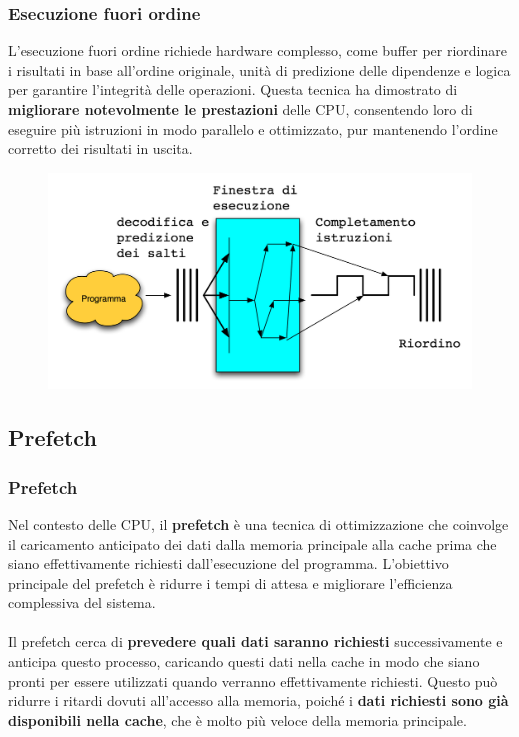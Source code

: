 \begin{frame}
	\frametitle{ Esecuzione fuori ordine}

		L'esecuzione fuori ordine richiede hardware complesso, come buffer per riordinare i risultati in base all'ordine originale, unità di predizione delle dipendenze e logica per garantire l'integrità delle operazioni. Questa tecnica ha dimostrato di \textbf{migliorare notevolmente le prestazioni} delle CPU, consentendo loro di eseguire più istruzioni in modo parallelo e ottimizzato, pur mantenendo l'ordine corretto dei risultati in uscita.%
		
		
		\begin{figure}[!htbp]
			\centering 
			\includegraphics[width=0.7\linewidth]{images/7_pipeline/superscalar_processor.png}
			\label{fig:pipeline_superscalar_processor}
		\end{figure}

\end{frame}


\subsection[Prefetch]{Prefetch}
\begin{frame}
	\frametitle{ Prefetch}

		Nel contesto delle CPU, il \textbf{prefetch} è una tecnica di ottimizzazione che coinvolge il caricamento anticipato dei dati dalla memoria principale alla cache prima che siano effettivamente richiesti dall'esecuzione del programma. L'obiettivo principale del prefetch è ridurre i tempi di attesa e migliorare l'efficienza complessiva del sistema.\\~\\
		Il prefetch cerca di \textbf{prevedere quali dati saranno richiesti} successivamente e anticipa questo processo, caricando questi dati nella cache in modo che siano pronti per essere utilizzati quando verranno effettivamente richiesti. Questo può ridurre i ritardi dovuti all'accesso alla memoria, poiché i \textbf{dati richiesti sono già disponibili nella cache}, che è molto più veloce della memoria principale.

\end{frame}



